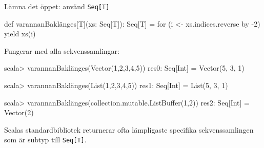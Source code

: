 \ifkompendium\else
\begin{Slide}{Lämna det öppet: använd \texttt{Seq[T]}}
\begin{Code}[basicstyle=\ttfamily]
def varannanBaklänges[T](xs: Seq[T]): Seq[T] = 
  for (i <- xs.indices.reverse by -2) yield xs(i) 
\end{Code}
Fungerar med alla sekvenssamlingar:
\begin{REPLnonum}
scala> varannanBaklänges(Vector(1,2,3,4,5))
res0: Seq[Int] = Vector(5, 3, 1)

scala> varannanBaklänges(List(1,2,3,4,5))
res1: Seq[Int] = List(5, 3, 1)

scala> varannanBaklänges(collection.mutable.ListBuffer(1,2))
res2: Seq[Int] = Vector(2)
\end{REPLnonum}
Scalas standardbibliotek returnerar ofta lämpligaste specifika sekvenssamlingen som är subtyp till \texttt{Seq[T]}.
\end{Slide}
\fi







